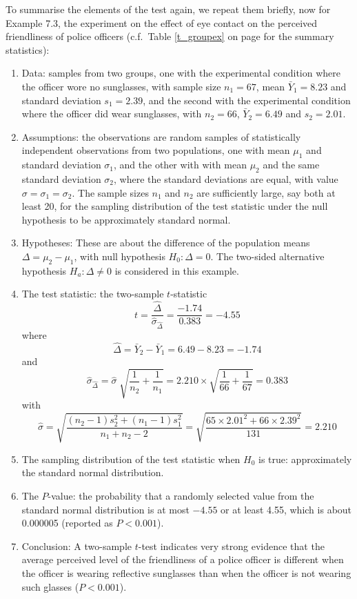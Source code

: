 \newpage
To summarise the elements of the test again, we repeat them briefly, now
for Example 7.3, the experiment on the effect of eye
contact on the perceived friendliness of police officers (c.f.\ Table
\ref{t_groupex} on page \pageref{t_groupex} for the summary statistics):
\begin{enumerate}
\item
Data: samples from two groups,
one with the experimental condition where
the officer wore no sunglasses,
with sample size $n_{1}=67$, mean $\bar{Y}_{1}=8.23$ and standard
deviation $s_{1}=2.39$, and
the second with the experimental condition where
the officer did wear sunglasses,
with $n_{2}=66$, $\bar{Y}_{2}=6.49$ and $s_{2}=2.01$.
\item
Assumptions: the observations are random samples of statistically
independent observations from two populations, one
with mean $\mu_{1}$ and standard deviation
$\sigma_{1}$, and the other with
with mean $\mu_{2}$ and the same standard deviation
$\sigma_{2}$, where the standard deviations are equal, with value
$\sigma=\sigma_{1}=\sigma_{2}$. The sample sizes $n_{1}$ and $n_{2}$ are
sufficiently large, say
both at least 20, for the sampling distribution of the test statistic
under the null hypothesis to be approximately standard normal.
\item
Hypotheses: These are about the difference of the population means
$\Delta=\mu_{2}-\mu_{1}$, with
null hypothesis $H_{0}: \Delta=0$. The two-sided alternative
hypothesis $H_{a}: \Delta\ne 0$ is considered in this example.
\item
The test statistic: the two-sample $t$-statistic
\[
t=\frac{\hat{\Delta}}{\hat{\sigma}_{\hat{\Delta}}}=
\frac{-1.74}{0.383}=-4.55
\]
where
\[
\hat{\Delta}=\bar{Y}_{2}-\bar{Y}_{1}=6.49-8.23=-1.74
\]
and
\[
\hat{\sigma}_{\hat{\Delta}}=
\hat{\sigma} \; \sqrt{\frac{1}{n_{2}}+\frac{1}{n_{1}}}
=2.210 \times \sqrt{
\frac{1}{66}+\frac{1}{67}}=0.383
\]
with
\[
\hat{\sigma}=
\sqrt{\frac{(n_{2}-1)s^{2}_{2}+(n_{1}-1)s^{2}_{1}}{n_{1}+n_{2}-2}}
=
\sqrt{\frac{65\times 2.01^{2}+66\times 2.39^{2}}{131}}
=2.210
\]
\item
The sampling distribution of the test statistic when $H_{0}$ is true:
approximately the standard normal distribution.
\item
The $P$-value: the probability that a randomly selected value from the
standard normal distribution is at most $-4.55$ or at least 4.55, which is
about 0.000005 (reported as $P<0.001$).
\item
Conclusion: A two-sample
$t$-test indicates very strong evidence that the average perceived
level of the friendliness of a police officer is different when the
officer is wearing reflective sunglasses than when the officer is not
wearing such glasses ($P<0.001$).
\end{enumerate}

